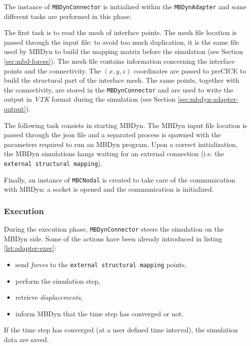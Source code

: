 The instance of \texttt{MBDynConnector} is initialized within the \texttt{MBDynAdapter} and some different tasks are performed in this phase.

The first task is to read the mesh of interface points. The mesh file location is passed through the input file: to avoid too much duplication, it is the same file used by MBDyn to build the mapping matrix before the simulation (see Section \ref{sec:mbd-forces}). The mesh file contains information concerning the interface points and the connectivity. The $(x,y,z)$ coordinates are passed to preCICE to build the structural part of the interface mesh. The same points, together with the connectivity, are stored in the \texttt{MBDynConnector} and are used to write the output in \textit{VTK} format during the simulation (see Section \ref{sec:mbdyn-adapter-output}).

The following task consists in starting MBDyn. The MBDyn input file location is passed through the \acrshort{json} file and a separated process is spawned with the parameters required to run an MBDyn program. Upon a correct initialization, the MBDyn simulations hangs waiting for an external connection (i.e. the \texttt{external structural mapping}).

Finally, an instance of \texttt{MBCNodal} is created to take care of the communication with MBDyn: a socket is opened and the communication is initialized. 


\subsubsection{Execution}

During the execution phase, \texttt{MBDynConnector} steers the simulation on the MBDyn side. Some of the actions have been already introduced in listing \ref{lst:adapter-exec}:

\begin{itemize}
    \item send \textit{forces} to the \texttt{external structural mapping} points,
    \item perform the simulation step,
    \item retrieve \textit{displacements},
    \item inform MBDyn that the time step has converged or not.
\end{itemize}

If the time step has converged (at a user defined time interval), the simulation data are saved.


